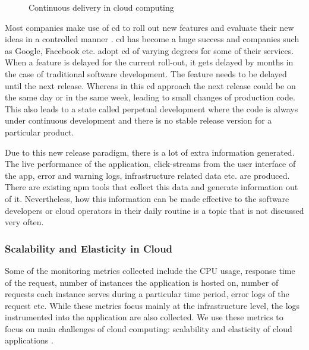 \documentclass[article,type=msc,colorback,12pt,accentcolor=tud8b,table]{tudthesis}
\begin{document}
		\begin{figure}
			\begin{center}
			\end{center}
			\caption{Continuous delivery in cloud computing \cite{humble2010continuous}}
			\label{fig:cd}
		\end{figure}
		
		Most companies make use of \gls{cd} to roll out new features and evaluate their new ideas in a controlled manner \cite{kohavi2007practical}. \gls{cd} has become a huge success and companies such as Google, Facebook etc. adopt \gls{cd} of varying degrees for some of their services. When a feature is delayed for the current roll-out, it gets delayed by months in the case of traditional software development. The feature needs to be delayed until the next release. Whereas in this \gls{cd} approach the next release could be on the same day or in the same week, leading to small changes of production code. This also leads to a state called perpetual development where the code is always under continuous development and there is no stable release version for a particular product.  	\par Due to this new release paradigm, there is a lot of extra information generated. The live performance of the application, click-streams from the user interface of the app, error and warning logs, infrastructure related data etc. are produced. There are existing \gls{apm} tools that collect this data and generate information out of it. Nevertheless, how this information can be made effective to the software developers or cloud operators in their daily routine is a topic that is not discussed very often. 
		
		\subsubsection{Scalability and Elasticity  in Cloud}
		
		Some of the monitoring metrics collected include the CPU usage, response time of the request, number of instances the application is hosted on, number of requests each instance serves during a particular time period, error logs of the request etc. While these metrics focus mainly at the infrastructure level, the logs instrumented into the application are also collected. We use these metrics to focus on main challenges of cloud computing: scalability and elasticity of cloud applications \cite{furht2010handbook}.
		
\end{document}
